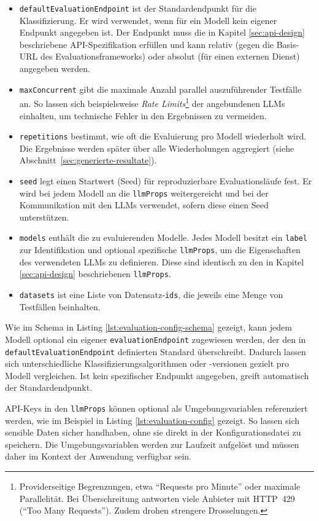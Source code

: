 \begin{itemize}
    \item \texttt{defaultEvaluationEndpoint} ist der Standardendpunkt für die Klassifizierung. Er wird verwendet, wenn für ein Modell kein eigener Endpunkt angegeben ist. Der Endpunkt muss die in Kapitel \ref{sec:api-design} beschriebene API-Spezifikation erfüllen und kann relativ (gegen die Basis-URL des Evaluationsframeworks) oder absolut (für einen externen Dienst) angegeben werden.
    \item \texttt{maxConcurrent} gibt die maximale Anzahl parallel auszuführender Testfälle an. So lassen sich beispielsweise \emph{Rate Limits}\footnote{Providerseitige Begrenzungen, etwa \enquote{Requests pro Minute} oder maximale Parallelität. Bei Überschreitung antworten viele Anbieter mit HTTP~429 (\enquote{Too Many Requests}). Zudem drohen strengere Drosselungen.} der angebundenen \acp{LLM} einhalten, um technische Fehler in den Ergebnissen zu vermeiden.
    \item \texttt{repetitions} bestimmt, wie oft die Evaluierung pro Modell wiederholt wird. Die Ergebnisse werden später über alle Wiederholungen aggregiert (siehe Abschnitt~\ref{sec:generierte-resultate}).
    \item \texttt{seed} legt einen Startwert (Seed) für reproduzierbare Evaluationsläufe fest. Er wird bei jedem Modell an die \texttt{llmProps} weitergereicht und bei der Kommunikation mit den \acp{LLM} verwendet, sofern diese einen Seed unterstützen.
    \item \texttt{models} enthält die zu evaluierenden Modelle. Jedes Modell besitzt ein \texttt{label} zur Identifikation und optional spezifische \texttt{llmProps}, um die Eigenschaften des verwendeten \acp{LLM} zu definieren. Diese sind identisch zu den in Kapitel \ref{sec:api-design} beschriebenen \texttt{llmProps}.
    \item \texttt{datasets} ist eine Liste von Datensatz-\texttt{ids}, die jeweils eine Menge von Testfällen beinhalten.
\end{itemize}

Wie im Schema in Listing \ref{lst:evaluation-config-schema} gezeigt, kann jedem Modell optional ein eigener \texttt{evaluationEndpoint} zugewiesen werden, der den in \texttt{defaultEvaluationEndpoint} definierten Standard überschreibt. Dadurch lassen sich unterschiedliche Klassifizierungsalgorithmen oder -versionen gezielt pro Modell vergleichen. Ist kein spezifischer Endpunkt angegeben, greift automatisch der Standardendpunkt.

API-Keys in den \texttt{llmProps} können optional als Umgebungsvariablen referenziert werden, wie im Beispiel in Listing \ref{lst:evaluation-config} gezeigt. So lassen sich sensible Daten sicher handhaben, ohne sie direkt in der Konfigurationsdatei zu speichern. Die Umgebungsvariablen werden zur Laufzeit aufgelöst und müssen daher im Kontext der Anwendung verfügbar sein.